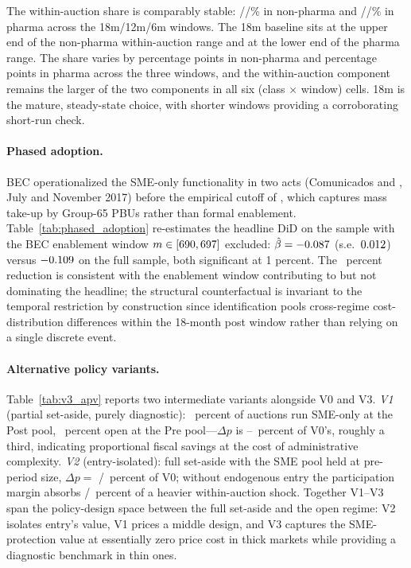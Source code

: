 The within-auction share is comparably stable: \windowShareEighteenNp/\windowShareTwelveNp/\windowShareSixNp\% in non-pharma and \windowShareEighteenPh/\windowShareTwelvePh/\windowShareSixPh\% in pharma across the 18m/12m/6m windows. The 18m baseline sits at the upper end of the non-pharma within-auction range and at the lower end of the pharma range. The share varies by \windowShareDriftNp{} percentage points in non-pharma and \windowShareDriftPh{} percentage points in pharma across the three windows, and the within-auction component remains the larger of the two components in all six (class $\times$ window) cells. 18m is the mature, steady-state choice, with shorter windows providing a corroborating short-run check.

\paragraph{Phased adoption.} BEC operationalized the SME-only functionality in two acts (Comunicados \comunicadoBECone{} and \comunicadoBECtwo, July and November 2017) before the empirical cutoff of \policyCutoffMonth, which captures mass take-up by Group-65 PBUs rather than formal enablement. Table~\ref{tab:phased_adoption} re-estimates the headline DiD on the sample with the BEC enablement window $m \in [690, 697]$ excluded: $\hat\beta = -0.087$ (s.e.\ $0.012$) versus $-0.109$ on the full sample, both significant at 1 percent. The \phasedReductionPct~percent reduction is consistent with the enablement window contributing to but not dominating the headline; the structural counterfactual is invariant to the temporal restriction by construction since identification pools cross-regime cost-distribution differences within the 18-month post window rather than relying on a single discrete event.



\paragraph{Alternative policy variants.} Table~\ref{tab:v3_apv} reports two intermediate variants alongside V0 and V3. \emph{V1} (partial set-aside, purely diagnostic): \vOneMidPct~percent of auctions run SME-only at the Post pool, \vOneMidPct~percent open at the Pre pool---$\Delta p$ is \vOneGapLo--\vOneGapHi~percent of V0's, roughly a third, indicating proportional fiscal savings at the cost of administrative complexity. \emph{V2} (entry-isolated): full set-aside with the SME pool held at pre-period size, $\Delta p = $ \latentShockTimesNp{}/\latentShockTimesPh~percent of V0; without endogenous entry the participation margin absorbs \latentShockRatioNp/\latentShockRatioPh~percent of a heavier within-auction shock. Together V1--V3 span the policy-design space between the full set-aside and the open regime: V2 isolates entry's value, V1 prices a middle design, and V3 captures the SME-protection value at essentially zero price cost in thick markets while providing a diagnostic benchmark in thin ones.

